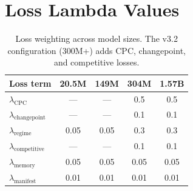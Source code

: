 \documentclass{article}
\begin{document}
\section{Loss Lambda Values}
\label{app:lambdas}

\begin{table}[h]
\centering
\caption{Loss weighting across model sizes. The v3.2 configuration (300M+)
adds CPC, changepoint, and competitive losses.}
\vspace{0.5em}
\begin{tabular}{lcccc}
\toprule
\textbf{Loss term} & \textbf{20.5M} & \textbf{149M} & \textbf{304M} & \textbf{1.57B} \\
\midrule
$\lambda_\text{CPC}$ & --- & --- & 0.5 & 0.5 \\
$\lambda_\text{changepoint}$ & --- & --- & 0.1 & 0.1 \\
$\lambda_\text{regime}$ & 0.05 & 0.05 & 0.3 & 0.3 \\
$\lambda_\text{competitive}$ & --- & --- & 0.1 & 0.1 \\
$\lambda_\text{memory}$ & 0.05 & 0.05 & 0.05 & 0.05 \\
$\lambda_\text{manifest}$ & 0.01 & 0.01 & 0.01 & 0.01 \\
\bottomrule
\end{tabular}
\end{table}
\end{document}
